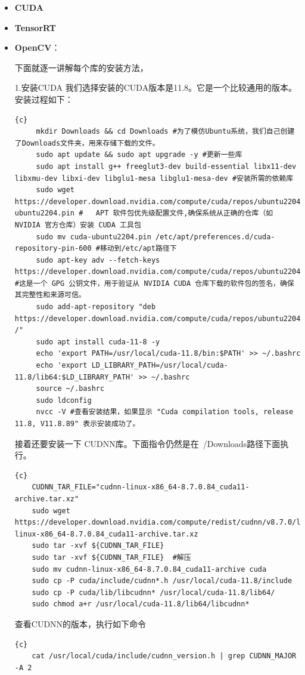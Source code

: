 \begin{itemize}
\item \textbf{CUDA}
\item \textbf{TensorRT}
\item \textbf{OpenCV}：

下面就逐一讲解每个库的安装方法，

1.安装CUDA
我们选择安装的CUDA版本是11.8。它是一个比较通用的版本。
安装过程如下：
\begin{lstlisting}{c}
     mkdir Downloads && cd Downloads #为了模仿Ubuntu系统，我们自己创建了Downloads文件夹，用来存储下载的文件。
     sudo apt update && sudo apt upgrade -y #更新一些库
     sudo apt install g++ freeglut3-dev build-essential libx11-dev libxmu-dev libxi-dev libglu1-mesa libglu1-mesa-dev #安装所需的依赖库
     sudo wget https://developer.download.nvidia.com/compute/cuda/repos/ubuntu2204/x86_64/cuda-ubuntu2204.pin #   APT 软件包优先级配置文件,确保系统从正确的仓库（如 NVIDIA 官方仓库）安装 CUDA 工具包
     sudo mv cuda-ubuntu2204.pin /etc/apt/preferences.d/cuda-repository-pin-600 #移动到/etc/apt路径下 
     sudo apt-key adv --fetch-keys https://developer.download.nvidia.com/compute/cuda/repos/ubuntu2204/x86_64/3bf863cc.pub #这是一个 GPG 公钥文件，用于验证从 NVIDIA CUDA 仓库下载的软件包的签名，确保其完整性和来源可信。 
     sudo add-apt-repository "deb https://developer.download.nvidia.com/compute/cuda/repos/ubuntu2204/x86_64/ /" 
     sudo apt install cuda-11-8 -y   
     echo 'export PATH=/usr/local/cuda-11.8/bin:$PATH' >> ~/.bashrc  
     echo 'export LD_LIBRARY_PATH=/usr/local/cuda-11.8/lib64:$LD_LIBRARY_PATH' >> ~/.bashrc 
     source ~/.bashrc 
     sudo ldconfig
     nvcc -V #查看安装结果，如果显示 "Cuda compilation tools, release 11.8, V11.8.89" 表示安装成功了。
\end{lstlisting}
接着还要安装一下 CUDNN库。下面指令仍然是在~/Downloads路径下面执行。
\begin{lstlisting}{c}
    CUDNN_TAR_FILE="cudnn-linux-x86_64-8.7.0.84_cuda11-archive.tar.xz" 
    sudo wget https://developer.download.nvidia.com/compute/redist/cudnn/v8.7.0/local_installers/11.8/cudnn-linux-x86_64-8.7.0.84_cuda11-archive.tar.xz  
    sudo tar -xvf ${CUDNN_TAR_FILE} 
    sudo tar -xvf ${CUDNN_TAR_FILE}  #解压
    sudo mv cudnn-linux-x86_64-8.7.0.84_cuda11-archive cuda
    sudo cp -P cuda/include/cudnn*.h /usr/local/cuda-11.8/include   
    sudo cp -P cuda/lib/libcudnn* /usr/local/cuda-11.8/lib64/                                                                 
    sudo chmod a+r /usr/local/cuda-11.8/lib64/libcudnn*
\end{lstlisting}
查看CUDNN的版本，执行如下命令
\begin{lstlisting}{c}
    cat /usr/local/cuda/include/cudnn_version.h | grep CUDNN_MAJOR -A 2
\end{lstlisting}


\end{itemize}
